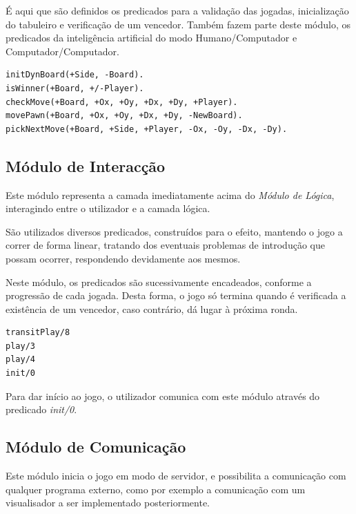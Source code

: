 \documentclass[15pt,a4paper]{article}
\begin{document}
É aqui que são definidos os predicados para a validação das jogadas, inicialização do tabuleiro e verificação de um vencedor. 
Também fazem parte deste módulo, os predicados da inteligência artificial do modo Humano/Computador e Computador/Computador.

\begin{lstlisting}
initDynBoard(+Side, -Board).
isWinner(+Board, +/-Player).
checkMove(+Board, +Ox, +Oy, +Dx, +Dy, +Player).
movePawn(+Board, +Ox, +Oy, +Dx, +Dy, -NewBoard).
pickNextMove(+Board, +Side, +Player, -Ox, -Oy, -Dx, -Dy).
\end{lstlisting}



\subsection{Módulo de Interacção}

Este módulo representa a camada imediatamente acima do \textit{Módulo de Lógica}, interagindo entre o utilizador e a camada lógica.

São utilizados diversos predicados, construídos para o efeito, mantendo o jogo a correr de forma linear, tratando dos eventuais problemas de introdução que possam ocorrer, respondendo devidamente aos mesmos.

Neste módulo, os predicados são sucessivamente encadeados, conforme a progressão de cada jogada. Desta forma, o jogo só termina quando é verificada a existência de um vencedor, caso contrário, dá lugar à
próxima ronda.

\begin{lstlisting}
transitPlay/8
play/3
play/4
init/0
\end{lstlisting}

Para dar início ao jogo, o utilizador comunica com este módulo através do predicado \textit{init/0}.


\subsection{Módulo de Comunicação}

Este módulo inicia o jogo em modo de servidor, e possibilita a comunicação com qualquer programa externo, como por exemplo a
comunicação com um visualisador a ser implementado posteriormente.
\end{document}
